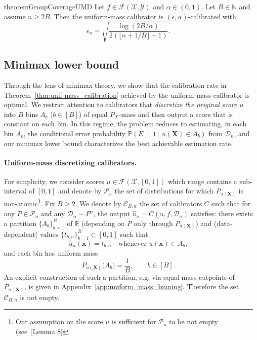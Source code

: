 \documentclass{article}
\theoremstyle{plain}
\theoremstyle{definition}
\theoremstyle{remark}
\begin{document}
\begin{restatable}{theorem}{GroupCoverageUMD}
\label{thm:unif-mass_calibration}
Let $f \in \mathcal{F}(\mathcal{X},\mathcal{Y})$ and $\alpha\in(0,1)$. Let $B\in\mathbb N$ and assume $n\ge 2B$. Then the uniform-mass calibrator is $(\epsilon, \alpha)$-calibrated with
$$
\epsilon_n = \sqrt{\frac{\log(2B/\alpha)}{2 (\lfloor n+1/B \rfloor -1)}}.
$$
\end{restatable}

\subsection{Minimax lower bound}
\label{sec:minimax}

Through the lens of minimax theory, we show that the calibration rate in
Theorem~\ref{thm:unif-mass_calibration} achieved by the uniform-mass calibrator is optimal.
We restrict attention to calibrators that \emph{discretize the original score $u$} into $B$ bins $A_b$ ($b \in [B]$)
of equal $P_X$-mass and then output a score that is constant on each bin. In this regime, the
problem reduces to estimating, in each bin $A_b$, the conditional error probability
$\mathbb{P}(E=1 \mid u(\mathbf{X}) \in A_b)$ from $\mathcal{D}_n$, and our minimax lower bound
characterizes the best achievable estimation rate.


\paragraph{Uniform-mass discretizing calibrators.} For simplicity, we consider scores $u \in \mathcal{F}(\mathcal{X}, [0,1])$ which range contains a sub-interval of $[0,1]$ and denote by $\mathcal{P}_u$ the set of distributions for which $P_{u(\mathbf{X})}$ is non-atomic\footnote{Our assumption on the score $u$ is sufficient for $\mathcal{P}_u$ to be not empty (see~\cite{gupta2022distributionfreebinaryclassificationprediction}[Lemma 8]}.
Fix $B\ge 2$. We denote by $\mathcal C_{B,n}$ the set of calibrators $C$ such that for any
$P\in\mathcal P_u$ and any $\mathcal D_n\sim P^n$, the output
$\widehat u_n = C(u,f,\mathcal D_n)$ satisfies: there exists a partition
$\{A_b\}_{b=1}^B$ of $\mathbb R$ (depending on $P$ only through $P_{u(\mathbf X)}$)
and (data-dependent) values $\{t_{b,n}\}_{b=1}^B\subset[0,1]$ such that
\[
\widehat u_n(\mathbf x)= t_{b,n}\quad\text{whenever }u(\mathbf x)\in A_b,
\]
and each bin has uniform mass
\[
P_{u(\mathbf X)}\!\big(A_b\big)=\frac{1}{B},\qquad b\in[B].
\]
An explicit construction of such a partition, e.g. via equal-mass cutpoints of $P_{u(\mathbf X)}$,
is given in Appendix~\ref{app:uniform_mass_binning}. Therefore the set $\mathcal C_{B,n}$ is not empty.
\end{document}
